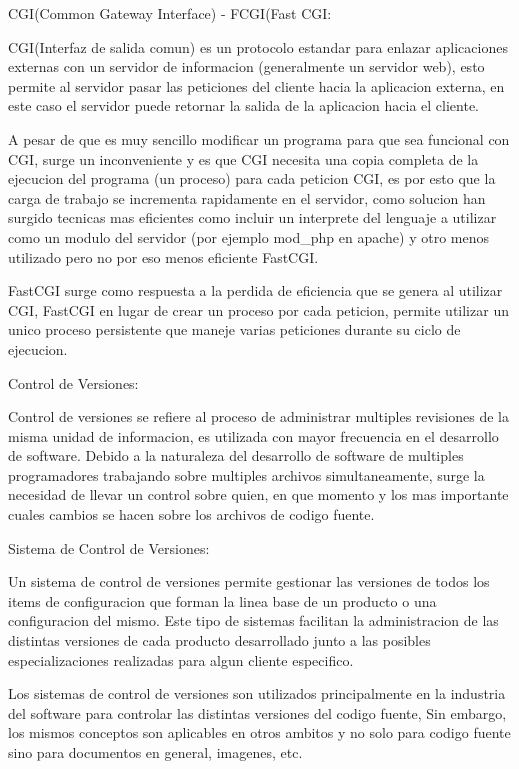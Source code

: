 CGI(Common Gateway Interface) - FCGI(Fast CGI:

CGI(Interfaz de salida comun) es un protocolo estandar para enlazar aplicaciones externas con un servidor de informacion (generalmente un servidor web), esto permite al servidor pasar las peticiones del cliente hacia la aplicacion externa, en este caso el servidor puede retornar la salida de la aplicacion hacia el cliente.


A pesar de que es muy sencillo modificar un programa para que sea funcional con CGI, surge un inconveniente y es que CGI necesita una copia completa de la ejecucion del programa (un proceso) para cada peticion CGI, es por esto que la carga de trabajo se incrementa rapidamente en el servidor, como solucion han surgido tecnicas mas eficientes como incluir un interprete del lenguaje a utilizar como un modulo del servidor (por ejemplo mod\_php en apache) y otro menos utilizado pero no por eso menos eficiente FastCGI.


FastCGI surge como respuesta a la perdida de eficiencia que se genera al utilizar CGI, FastCGI en lugar de crear un proceso por cada peticion, permite utilizar un unico proceso persistente que maneje varias peticiones durante su ciclo de ejecucion.



Control de Versiones:

Control de versiones se refiere al proceso de administrar multiples revisiones de la misma unidad de informacion, es utilizada con mayor frecuencia en el desarrollo de software.
Debido a la naturaleza del desarrollo de software de multiples programadores trabajando sobre multiples archivos simultaneamente, surge la necesidad de llevar un control sobre quien, en que momento y los mas importante cuales cambios se hacen sobre los archivos de codigo fuente.


Sistema de Control de Versiones:

Un sistema de control de versiones permite gestionar las versiones de todos los items de configuracion que forman la linea base de un producto o una configuracion del mismo. Este tipo de sistemas facilitan la administracion de las distintas versiones de cada producto desarrollado junto a las posibles especializaciones realizadas para algun cliente especifico.

Los sistemas de control de versiones son utilizados principalmente en la industria del software para controlar las distintas versiones del codigo fuente, Sin embargo, los mismos conceptos son aplicables en otros ambitos y no solo para codigo fuente sino para documentos en general, imagenes, etc.


